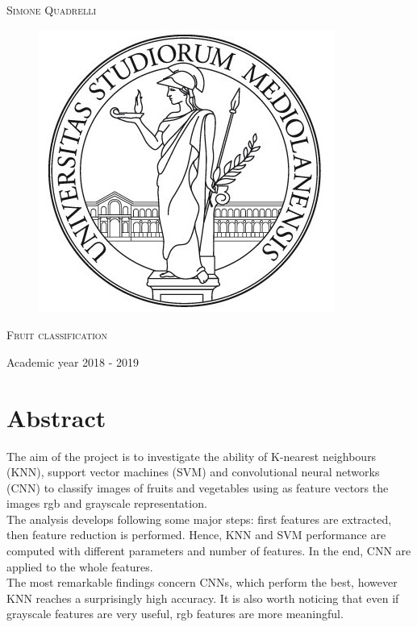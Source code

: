 \documentclass{article}
\begin{document}
\begin{titlepage}
	
	
	\begin{center}
		\vspace{2 cm}
		{\Large \textsc{Simone Quadrelli} }
	\end{center}
	
	
	\begin{figure}[H]
		\vspace{2 cm}
		\centering
		\includegraphics[width=0.30\linewidth]{tesiSCIENZE_TECNOLOGIE.jpg}
		
	\end{figure}
	
	\begin{center}
		\vspace{2 cm}
		{\Large \textsc{Fruit classification} }
	\end{center}

	\par
	\vspace{3 cm}
	
	\begin{center}
		{\large Academic year 2018 - 2019}
	\end{center}
\end{titlepage}

\newpage 
{}
\tableofcontents
\listoftables
\listoffigures
\newpage


\section*{Abstract}
The aim of the project is to investigate the ability of K-nearest neighbours (KNN), support vector machines (SVM) and convolutional neural networks (CNN) to classify images of fruits and vegetables using as feature vectors the images rgb and grayscale representation.\\
The analysis develops following some major steps: first features are extracted, then feature reduction is performed. Hence, KNN and SVM performance are computed with different parameters and number of features. In the end, CNN are applied to the whole features. \\
The most remarkable findings concern CNNs, which perform the best, however KNN reaches a surprisingly high accuracy. It is also worth noticing that  even if grayscale features are very useful, rgb features are more meaningful.
\end{document}
